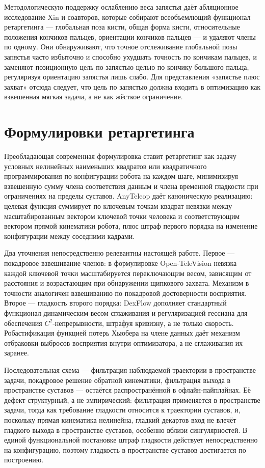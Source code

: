 \documentclass[12pt, a4paper, oneside]{report}
\begin{document}
Методологическую поддержку ослаблению веса запястья даёт абляционное
исследование Xin и соавторов, которые собирают всеобъемлющий функционал
ретаргетинга --- глобальная поза кисти, общая форма кисти, относительные
положения кончиков пальцев, ориентации кончиков пальцев --- и удаляют члены по
одному. Они обнаруживают, что точное отслеживание глобальной позы запястья
часто избыточно и способно ухудшать точность по кончикам пальцев, и заменяют
позиционную цель по запястью целью по кончику большого пальца, регуляризуя
ориентацию запястья лишь слабо. Для представления «запястье плюс захват» отсюда
следует, что цель по запястью должна входить в оптимизацию как взвешенная мягкая
задача, а не как жёсткое ограничение.

\section{Формулировки ретаргетинга}

Преобладающая современная формулировка ставит ретаргетинг как задачу условных
нелинейных наименьших квадратов или квадратичного программирования по
конфигурации робота на каждом шаге, минимизируя взвешенную сумму члена
соответствия данным и члена временной гладкости при ограничениях на пределы
суставов. AnyTeleop даёт каноническую реализацию: целевая функция суммирует по
ключевым точкам квадрат невязки между масштабированным вектором ключевой точки
человека и соответствующим вектором прямой кинематики робота, плюс штраф первого
порядка на изменение конфигурации между соседними кадрами.

Два уточнения непосредственно релевантны настоящей работе. Первое --- покадровое
взвешивание членов: в формулировке Open-TeleVision невязка каждой ключевой точки
масштабируется переключающим весом, зависящим от расстояния и возрастающим при
обнаружении щипкового захвата. Механизм в точности аналогичен взвешиванию по
покадровой достоверности восприятия. Второе --- гладкость второго порядка:
DexFlow дополняет стандартный функционал динамическим весом сглаживания и
регуляризацией гессиана для обеспечения $C^2$-непрерывности, штрафуя кривизну, а
не только скорость. Робастификация функцией потерь Хьюбера на члене данных даёт
механизм отбраковки выбросов восприятия внутри оптимизатора, а не сглаживания их
заранее.

Последовательная схема --- фильтрация наблюдаемой траектории в пространстве
задачи, покадровое решение обратной кинематики, фильтрация выхода в пространстве
суставов --- остаётся распространённой в офлайн-пайплайнах. Её дефект
структурный, а не эмпирический: фильтрация применяется в пространстве задачи,
тогда как требование гладкости относится к траектории суставов, и, поскольку
прямая кинематика нелинейна, гладкий декартов вход не влечёт гладкого выхода в
пространстве суставов, особенно вблизи сингулярностей. В единой функциональной
постановке штраф гладкости действует непосредственно на конфигурацию, поэтому
гладкость в пространстве суставов достигается по построению.
\end{document}
